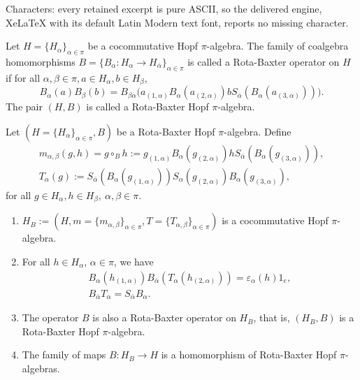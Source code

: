 \documentclass[10pt,a4paper]{amsart}
\def\a{\alpha}
\def\b{\beta}
\def\v{\varepsilon}
\begin{document}
Characters: every retained excerpt is pure ASCII, so the delivered engine, XeLaTeX with its default Latin Modern text font, reports no missing character.
\begin{definition}
Let $H=\{H_\a\}_{\a\in\pi}$ be a cocommutative Hopf $\pi$-algebra. The family of coalgebra homomorphisms $B=\{B_\a:H_\a\rightarrow H_{\bar{\a}}\}_{\a\in\pi}$ is called a Rota-Baxter operator on $H$ if for all $\a,\b\in\pi, a\in H_\a,b\in H_\b$,
\begin{equation} \label{eq:RBO}
  B_\a(a)B_\b(b)=B_{\b\a}\big(a_{(1,\a)}B_\a(a_{(2,\a)})bS_{\bar{\a}}(B_\a(a_{(3,\a)}))\big).
\end{equation}
The pair $(H,B)$ is called a Rota-Baxter Hopf $\pi$-algebra.
\end{definition}

\begin{lemma}\label{lem:nH}
Let $(H=\{H_\a\}_{\a\in\pi},B)$ be a Rota-Baxter Hopf $\pi$-algebra. Define
\begin{eqnarray}
& m_{\a,\b}(g,h)=g\circ_B h:=g_{(1,\a)}B_\a(g_{(2,\a)})hS_{\bar{\a}}(B_\a(g_{(3,\a)})), & \label{eq:RBHm}\\
& T_\a(g):=S_{\bar{\a}}(B_\a(g_{(1,\a)}))S_\a(g_{(2,\a)})B_\a(g_{(3,\a)}), & \label{eq:RBHS}
\end{eqnarray}
for all $g\in H_\a,h\in H_\b, ~\a,\b\in\pi$.
\begin{enumerate}[\quad\rm(1)]
\item $H_B:=(H,m=\{m_{\a,\b}\}_{\a\in\pi},T=\{T_{\a,\b}\}_{\a\in\pi})$ is a cocommutative Hopf $\pi$-algebra. %
\item For all $h\in H_\a$, $\a\in\pi$, we have
\begin{eqnarray}
 & B_\a(h_{(1,\a)})B_{\bar{\a}}(T_\a(h_{(2,\a)}))=\v_\a(h)1_e, \label{eq:t} & \\
 & B_{\bar{\a}}T_\a = S_{\bar{\a}}B_\a. &
\end{eqnarray}

\item The operator $B$ is also a Rota-Baxter operator on $H_B$, that is, $(H_B,B)$ is a Rota-Baxter Hopf $\pi$-algebra.
\item The family of maps $B:H_B\rightarrow H$ is a homomorphism of Rota-Baxter Hopf $\pi$-algebras.
\end{enumerate}
\end{lemma}
\end{document}

